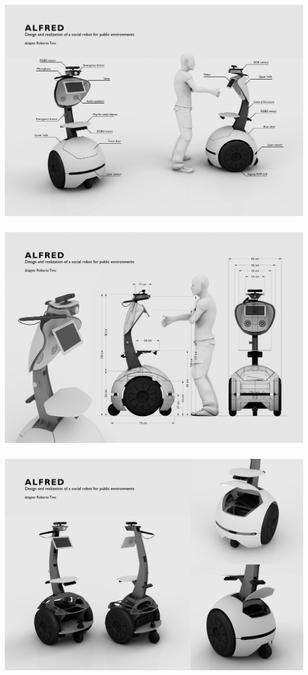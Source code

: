\begin{center}
\includegraphics[height=10cm]{fig/Tavola01.jpg}
\includegraphics[height=10cm]{fig/Tavola02.jpg}
\includegraphics[height=10cm]{fig/Tavola03.jpg}

\end{center}
